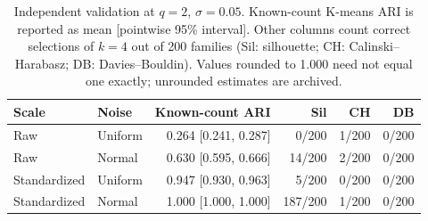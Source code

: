 \begin{table}[htbp]
\centering\footnotesize
\setlength{\tabcolsep}{3pt}
\caption{Independent validation at $q=2$, $\sigma=0.05$. Known-count K-means
ARI is reported as mean [pointwise 95\% interval]. Other columns count correct
selections of $k=4$ out of 200 families (Sil: silhouette; CH: Calinski--Harabasz;
DB: Davies--Bouldin). Values rounded to 1.000 need not equal one exactly;
unrounded estimates are archived.}
\label{tab:primary}
\begin{tabular}{llrrrr}
\toprule
Scale & Noise & Known-count ARI & Sil & CH & DB \\
\midrule
Raw & Uniform & 0.264 [0.241, 0.287] & 0/200 & 1/200 & 0/200 \\
Raw & Normal & 0.630 [0.595, 0.666] & 14/200 & 2/200 & 0/200 \\
Standardized & Uniform & 0.947 [0.930, 0.963] & 5/200 & 0/200 & 0/200 \\
Standardized & Normal & 1.000 [1.000, 1.000] & 187/200 & 1/200 & 0/200 \\
\bottomrule
\end{tabular}
\end{table}
